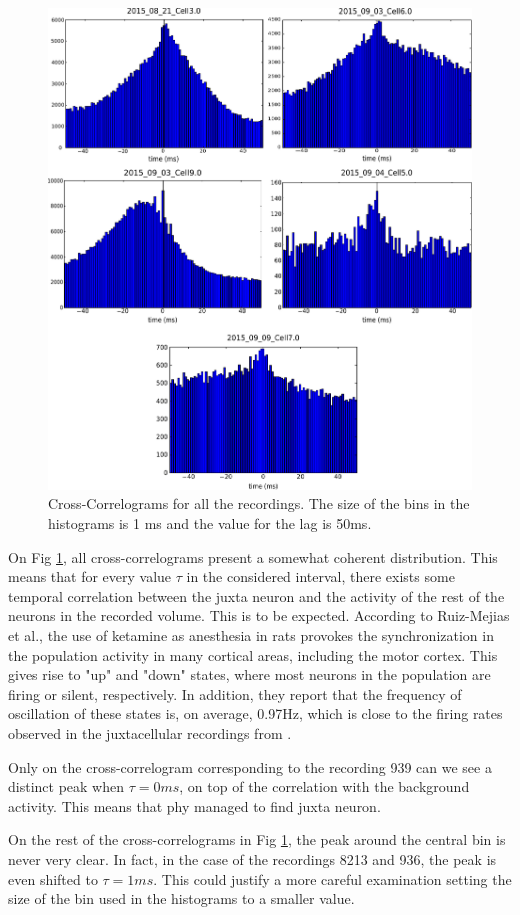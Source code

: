 \documentclass[10pt]{article}
\begin{document}
\begin{figure}[!h]
	\centering
	\includegraphics[width=0.8\linewidth]{CC.pdf}
	\caption{Cross-Correlograms for all the recordings. The size of the bins in the histograms is 1 ms and the value for the lag is 50ms.
}
\label{fig:CC}
\end{figure}


On Fig \ref{fig:CC}, all cross-correlograms present a somewhat coherent distribution. This means that for every value $\tau$ in the considered interval, there exists some temporal correlation between the juxta neuron and the activity of the rest of the neurons in the recorded volume. This is to be expected. According to Ruiz-Mejias et al., the use of ketamine as anesthesia in rats provokes the synchronization in the population activity in many cortical areas, including the motor cortex. This gives rise to "up" and "down" states, where most neurons in the population are firing or silent, respectively. In addition, they report that the frequency of oscillation of these states is, on average, 0.97Hz, which is close to the firing rates observed in the juxtacellular recordings from \cite{Netoetal}. 

Only on the cross-correlogram corresponding to the recording 939 can we see a distinct peak when $\tau=0 ms$, on top of the correlation with the background activity. This means that phy managed to find juxta neuron.

On the rest of the cross-correlograms in Fig \ref{fig:CC}, the peak around the central bin is never very clear. In fact, in the case of the recordings 8213 and 936, the peak is even shifted to $\tau=1 ms$. This could justify a more careful examination setting the size of the bin used in the histograms to a smaller value.
\end{document}
